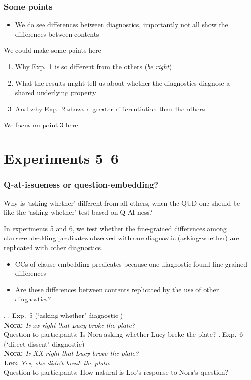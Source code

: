 \documentclass[compress, xcolor = dvipsnames, aspectratio=169]{beamer}
\begin{document}
	\begin{frame}[t]\frametitle{Some points}
		\begin{itemize}
			\item We do see differences between diagnostics, importantly not all show the differences between contents 
		\end{itemize}	

		We could make some points here
		\begin{enumerate}
			\item Why Exp.~1 is so different from the others (\emph{be right})
			\item What the results might tell us about whether the diagnostics diagnose a shared underlying property
			\item And why Exp.~2 shows a greater differentiation than the others
		\end{enumerate}
		
		We focus on point 3 here
	
	\end{frame}

\section{Experiments 5--6}
	\begin{frame}[t]\frametitle{Q-at-issueness or question-embedding?}\scriptsize
		
		Why is `asking whether' different from all others, when the QUD-one should be like the `asking whether' test based on Q-AI-ness?

		In experiments 5 and 6, we test whether the fine-grained differences among clause-embedding predicates observed with one diagnostic (asking-whether) are replicated with other diagnostics.
		  \begin{itemize}
		    \item CCs of clause-embedding predicates because one diagnostic found fine-grained differences
		    \item Are these differences between contents replicated by the use of other diagnostics?
		  \end{itemize}

		\ex.
	    \a.\label{exp5} Exp.~5 (`asking whether' diagnostic )
	    \\ {\bf Nora:} \emph{Is xx right that Lucy broke the plate?}
	    \\ Question to participants: Is Nora asking whether Lucy broke the plate?
	    \b.\label{exp6} Exp.~6 (`direct dissent' diagnostic)
	    \\ {\bf Nora:} \emph{Is XX right that Lucy broke the plate?}
	    \\ {\bf Leo:} \emph{Yes, she didn't break the plate.}
	    \\ Question to participants: How natural is Leo's response to Nora's question?
	
	\end{frame}
\end{document}
